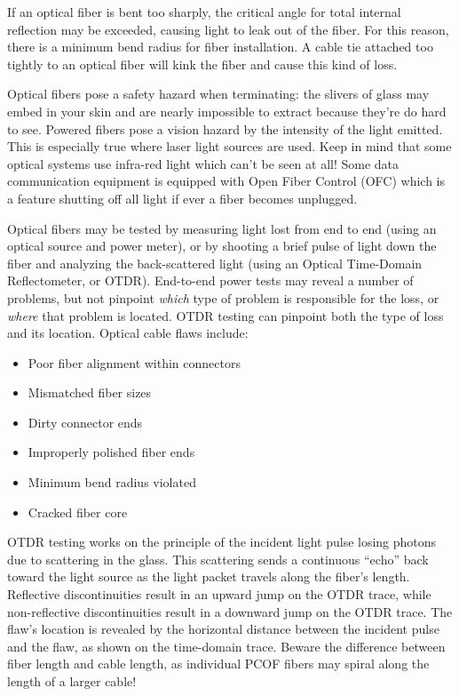 \vskip 10pt

If an optical fiber is bent too sharply, the critical angle for total internal reflection may be exceeded, causing light to leak out of the fiber.  For this reason, there is a minimum bend radius for fiber installation.  A cable tie attached too tightly to an optical fiber will kink the fiber and cause this kind of loss.

\vskip 10pt

Optical fibers pose a safety hazard when terminating: the slivers of glass may embed in your skin and are nearly impossible to extract because they're do hard to see.  Powered fibers pose a vision hazard by the intensity of the light emitted.  This is especially true where laser light sources are used.  Keep in mind that some optical systems use infra-red light which can't be seen at all!  Some data communication equipment is equipped with Open Fiber Control (OFC) which is a feature shutting off all light if ever a fiber becomes unplugged.

\vskip 10pt

Optical fibers may be tested by measuring light lost from end to end (using an optical source and power meter), or by shooting a brief pulse of light down the fiber and analyzing the back-scattered light (using an Optical Time-Domain Reflectometer, or OTDR).  End-to-end power tests may reveal a number of problems, but not pinpoint {\it which} type of problem is responsible for the loss, or {\it where} that problem is located.  OTDR testing can pinpoint both the type of loss and its location.  Optical cable flaws include:

\begin{itemize}
\item{} Poor fiber alignment within connectors
\item{} Mismatched fiber sizes
\item{} Dirty connector ends
\item{} Improperly polished fiber ends
\item{} Minimum bend radius violated
\item{} Cracked fiber core
\end{itemize}

OTDR testing works on the principle of the incident light pulse losing photons due to scattering in the glass.  This scattering sends a continuous ``echo'' back toward the light source as the light packet travels along the fiber's length.  Reflective discontinuities result in an upward jump on the OTDR trace, while non-reflective discontinuities result in a downward jump on the OTDR trace.  The flaw's location is revealed by the horizontal distance between the incident pulse and the flaw, as shown on the time-domain trace.  Beware the difference between fiber length and cable length, as individual PCOF fibers may spiral along the length of a larger cable!




